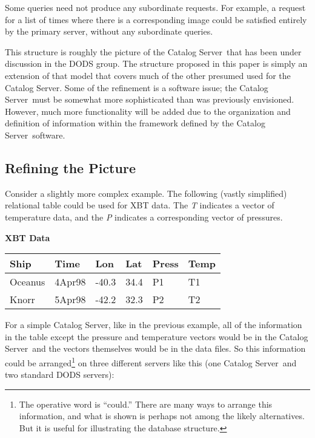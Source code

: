 \documentclass[10pt]{report}
\newcommand{\cs}{Catalog Server}
\begin{document}
Some queries need not produce any subordinate requests.  For example,
a request for a list of times where there is a corresponding image
could be satisfied entirely by the primary server, without any
subordinate queries.

This structure is roughly the picture of the \cs\ that has been under
discussion in the DODS group.  The structure proposed in this paper is
simply an extension of that model that covers much of the other
presumed used for the \cs .  Some of the refinement is a software
issue; the \cs\ must be somewhat more sophisticated than was
previously envisioned.  However, much more functionality will be added
due to the organization and definition of information within the
framework defined by the \cs\ software.

\subsection{Refining the Picture}

Consider a slightly more complex example.  The following (vastly
simplified) relational table could be used for XBT data.  The \emph{T}
indicates a vector of temperature data, and the \emph{P} indicates a
corresponding vector of pressures.

\begin{center}
\textbf{XBT Data} \\
\begin{tabular}{|l|l|l|l|l|l|} \hline
Ship    &Time    &Lon  &Lat &Press &Temp  \\ \hline
Oceanus &4Apr98 &-40.3 &34.4&P1    &T1    \\
Knorr   &5Apr98 &-42.2 &32.3&P2    &T2    \\ \hline 
\end{tabular}
\end{center}

For a simple \cs , like in the previous example, all of the
information in the table except the pressure and temperature vectors
would be in the \cs\ and the vectors themselves would be in the data
files.  So this information could be arranged\footnote{The operative
  word is ``could.''  There are many ways to arrange this information,
  and what is shown is perhaps not among the likely alternatives.  But
  it is useful for illustrating the database structure.} on three
different servers like this (one \cs\ and two standard DODS servers):
\end{document}
